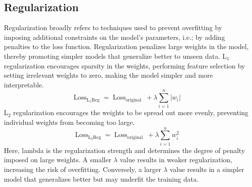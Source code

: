 \subsection{Regularization}
Regularization broadly refers to techniques used to prevent overfitting by imposing additional constraints on the model's parameters, i.e.; by adding penalties to the loss function. Regularization penalizes large weights in the model, thereby promoting simpler models that generalize better to unseen data. 
L$_1$ regularization encourages sparsity in the weights, performing feature selection by setting irrelevant weights to zero, making the model simpler and more interpretable. 
\[ \operatorname{Loss}_{\mathrm{L}_1 \text{Reg}}=\operatorname{Loss}_{\text {original }}+\lambda \sum_{i=1}^n\left|w_i\right| \]
L$_2$ regularization encourages the weights to be spread out more evenly, preventing individual weights from becoming too large.
\[ \operatorname{Loss}_{\mathrm{L}_2 \text{Reg}}=\operatorname{Loss}_{\text {original }}+\lambda \sum_{i=1}^n w^2_i \]
Here, \gls{lambda} is the regularization strength and determines the degree of penalty imposed on large weights. A smaller $\lambda$ value results in weaker regularization, increasing the risk of overfitting. Conversely, a larger $\lambda$ value results in a simpler model that generalizes better but may underfit the training data.
